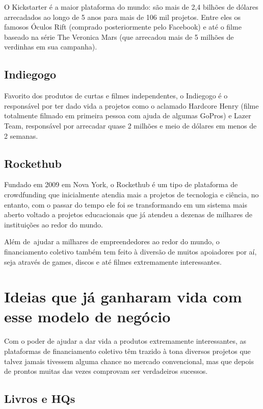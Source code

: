 \documentclass{classe_cn}                 %
\begin{document}
O Kickstarter é a maior plataforma do mundo: são mais de 2,4 bilhões de dólares arrecadados ao longo de 5 anos para mais de 106 mil projetos. Entre eles os famosos Óculos Rift (comprado posteriormente pelo Facebook) e até o filme baseado na série The Veronica Mars (que arrecadou mais de 5 milhões de verdinhas em sua campanha).

\subsection{Indiegogo}

Favorito dos produtos de curtas e filmes independentes, o Indiegogo é o responsável por ter dado vida a projetos como o aclamado Hardcore Henry (filme totalmente filmado em primeira pessoa com ajuda de algumas GoPros) e Lazer Team, responsável por arrecadar quase 2 milhões e meio de dólares em menos de 2 semanas.

\subsection{Rockethub}

Fundado em 2009 em Nova York, o Rockethub é um tipo de plataforma de crowdfunding que inicialmente atendia mais a projetos de tecnologia e ciência, no entanto, com o passar do tempo ele foi se transformando em um sistema mais aberto voltado a projetos educacionais que já atendeu a dezenas de milhares de instituições ao redor do mundo.

Além de ajudar a milhares de empreendedores ao redor do mundo, o financiamento coletivo também tem feito à diversão de muitos apoiadores por aí, seja através de games, discos e até filmes extremamente interessantes.

\section{Ideias que já ganharam vida com esse modelo de negócio}

Com o poder de ajudar a dar vida a produtos extremamente interessantes, as plataformas de financiamento coletivo têm trazido à tona diversos projetos que talvez jamais tivessem alguma chance no mercado convencional, mas que depois de prontos muitas das vezes comprovam ser verdadeiros sucessos.

\subsection{Livros e HQs}
\end{document}
